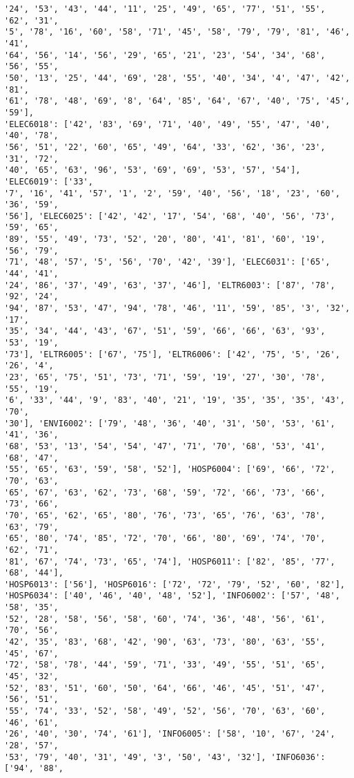 \documentclass[11pt]{article}
\begin{document}
\begin{Verbatim}[commandchars=\\\{\}]
'24', '53', '43', '44', '11', '25', '49', '65', '77', '51', '55', '62', '31',
'5', '78', '16', '60', '58', '71', '45', '58', '79', '79', '81', '46', '41',
'64', '56', '14', '56', '29', '65', '21', '23', '54', '34', '68', '56', '55',
'50', '13', '25', '44', '69', '28', '55', '40', '34', '4', '47', '42', '81',
'61', '78', '48', '69', '8', '64', '85', '64', '67', '40', '75', '45', '59'],
'ELEC6018': ['42', '83', '69', '71', '40', '49', '55', '47', '40', '40', '78',
'56', '51', '22', '60', '65', '49', '64', '33', '62', '36', '23', '31', '72',
'40', '65', '63', '96', '53', '69', '69', '53', '57', '54'], 'ELEC6019': ['33',
'7', '16', '41', '57', '1', '2', '59', '40', '56', '18', '23', '60', '36', '59',
'56'], 'ELEC6025': ['42', '42', '17', '54', '68', '40', '56', '73', '59', '65',
'89', '55', '49', '73', '52', '20', '80', '41', '81', '60', '19', '56', '79',
'71', '48', '57', '5', '56', '70', '42', '39'], 'ELEC6031': ['65', '44', '41',
'24', '86', '37', '49', '63', '37', '46'], 'ELTR6003': ['87', '78', '92', '24',
'94', '87', '53', '47', '94', '78', '46', '11', '59', '85', '3', '32', '17',
'35', '34', '44', '43', '67', '51', '59', '66', '66', '63', '93', '53', '19',
'73'], 'ELTR6005': ['67', '75'], 'ELTR6006': ['42', '75', '5', '26', '26', '4',
'23', '65', '75', '51', '73', '71', '59', '19', '27', '30', '78', '55', '19',
'6', '33', '44', '9', '83', '40', '21', '19', '35', '35', '35', '43', '70',
'30'], 'ENVI6002': ['79', '48', '36', '40', '31', '50', '53', '61', '41', '36',
'68', '53', '13', '54', '54', '47', '71', '70', '68', '53', '41', '68', '47',
'55', '65', '63', '59', '58', '52'], 'HOSP6004': ['69', '66', '72', '70', '63',
'65', '67', '63', '62', '73', '68', '59', '72', '66', '73', '66', '73', '66',
'70', '65', '62', '65', '80', '76', '73', '65', '76', '63', '78', '63', '79',
'65', '80', '74', '85', '72', '70', '66', '80', '69', '74', '70', '62', '71',
'81', '67', '74', '73', '65', '74'], 'HOSP6011': ['82', '85', '77', '68', '44'],
'HOSP6013': ['56'], 'HOSP6016': ['72', '72', '79', '52', '60', '82'],
'HOSP6034': ['40', '46', '40', '48', '52'], 'INFO6002': ['57', '48', '58', '35',
'52', '28', '58', '56', '58', '60', '74', '36', '48', '56', '61', '70', '56',
'42', '35', '83', '68', '42', '90', '63', '73', '80', '63', '55', '45', '67',
'72', '58', '78', '44', '59', '71', '33', '49', '55', '51', '65', '45', '32',
'52', '83', '51', '60', '50', '64', '66', '46', '45', '51', '47', '56', '51',
'55', '74', '33', '52', '58', '49', '52', '56', '70', '63', '60', '46', '61',
'26', '40', '30', '74', '61'], 'INFO6005': ['58', '10', '67', '24', '28', '57',
'53', '79', '40', '31', '49', '3', '50', '43', '32'], 'INFO6036': ['94', '88',

\end{Verbatim}
\end{document}
